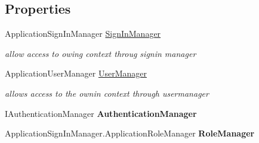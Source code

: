 \subsection*{Properties}
\begin{DoxyCompactItemize}
\item 
Application\+Sign\+In\+Manager \hyperlink{class_alfa_accounting_1_1_controllers_1_1_account_controller_acc05fd520ca89799979b9b0d389407d7}{Sign\+In\+Manager}
\begin{DoxyCompactList}\small\item\em allow access to owing context throug signin manager \end{DoxyCompactList}\item 
Application\+User\+Manager \hyperlink{class_alfa_accounting_1_1_controllers_1_1_account_controller_af407b4124a36361363279ce45a2d8e78}{User\+Manager}
\begin{DoxyCompactList}\small\item\em allows access to the ownin context through usermanager \end{DoxyCompactList}\item 
\mbox{\label{class_alfa_accounting_1_1_controllers_1_1_account_controller_a70d354918dbd3b0c18f08871722b53ca}} 
I\+Authentication\+Manager {\bfseries Authentication\+Manager}
\item 
\mbox{\label{class_alfa_accounting_1_1_controllers_1_1_account_controller_a40b23f6c7851ae1134f37cf1ddb319f5}} 
Application\+Sign\+In\+Manager.\+Application\+Role\+Manager {\bfseries Role\+Manager}
\end{DoxyCompactItemize}
